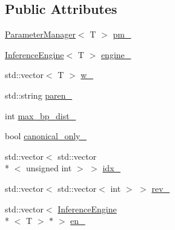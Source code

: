\subsection*{Public Attributes}
\begin{DoxyCompactItemize}
\item 
\hyperlink{class_parameter_manager}{Parameter\+Manager}$<$ T $>$ \hyperlink{struct_c_o_n_t_r_afold_m_1_1_impl_a60c3b1fda2951015e561097906d52032}{pm\+\_\+}
\item 
\hyperlink{class_inference_engine}{Inference\+Engine}$<$ T $>$ \hyperlink{struct_c_o_n_t_r_afold_m_1_1_impl_acd8955919fbf8c8f9d86fc195a00cdb0}{engine\+\_\+}
\item 
std\+::vector$<$ T $>$ \hyperlink{struct_c_o_n_t_r_afold_m_1_1_impl_a0d3688ca0a9ab1331d4976e92d2e8513}{w\+\_\+}
\item 
std\+::string \hyperlink{struct_c_o_n_t_r_afold_m_1_1_impl_ad7f267d1860e0ccdeb4f5f269f1672c6}{paren\+\_\+}
\item 
int \hyperlink{struct_c_o_n_t_r_afold_m_1_1_impl_a9bf98e3520a857cc2f74c4c498c15f94}{max\+\_\+bp\+\_\+dist\+\_\+}
\item 
bool \hyperlink{struct_c_o_n_t_r_afold_m_1_1_impl_ab91edfe6d89438fdb6bf2edb6eeaa199}{canonical\+\_\+only\+\_\+}
\item 
std\+::vector$<$ std\+::vector\\*
$<$ unsigned int $>$ $>$ \hyperlink{struct_c_o_n_t_r_afold_m_1_1_impl_ae0d86d3732f74d42ba6cc5993185aebb}{idx\+\_\+}
\item 
std\+::vector$<$ std\+::vector$<$ int $>$ $>$ \hyperlink{struct_c_o_n_t_r_afold_m_1_1_impl_a01416d1629455fa35c6c215f271b49de}{rev\+\_\+}
\item 
std\+::vector$<$ \hyperlink{class_inference_engine}{Inference\+Engine}\\*
$<$ T $>$ $\ast$ $>$ \hyperlink{struct_c_o_n_t_r_afold_m_1_1_impl_a340457442751e450885b41148f2f8d04}{en\+\_\+}
\end{DoxyCompactItemize}


